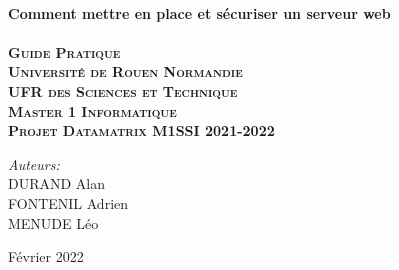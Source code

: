 \begin{titlepage}

\center %



\HRule \\[0.4cm]
{ \huge \bfseries Comment mettre en place et sécuriser un serveur web}\\[0.4cm] %
\HRule \\[1.5cm]

\textsc{\huge \textbf{Guide Pratique }}\\[1.5cm]

\textsc{\Large \textbf{Université de Rouen Normandie \\[0.07cm] UFR des Sciences et Technique \\[1,5cm] Master 1 Informatique\\[0.5cm] Projet Datamatrix M1SSI 2021-2022}}


\vspace{3cm}

\begin{center} \large
\Large \emph{Auteurs:}\\[0.1cm]
\Large DURAND Alan\\
\Large FONTENIL Adrien\\
\Large MENUDE Léo\\ 
\end{center}



{\large Février 2022}\\[2cm] %


\vfill %

\end{titlepage}